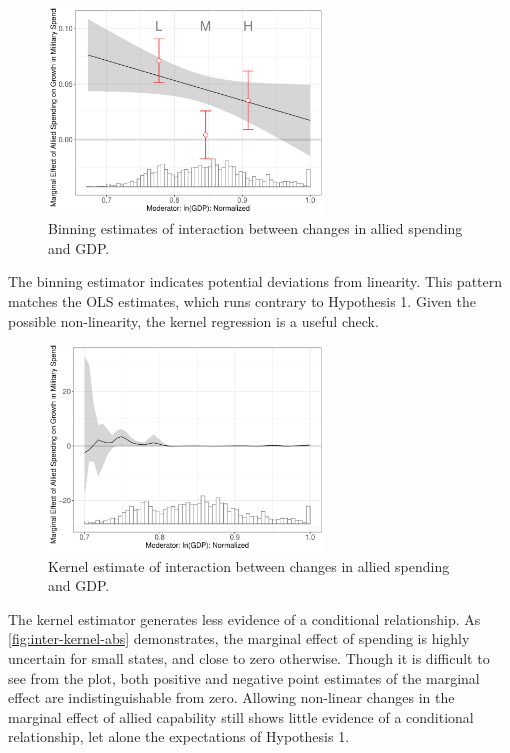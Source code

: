 \documentclass[12pt]{article}
\begin{document}
\begin{figure}
	\centering
		\includegraphics[width=0.65\textwidth]{inter-bin-abs.pdf}
		\caption{Binning estimates of interaction between changes in allied spending and GDP.}
	\label{fig:inter-bin-abs}
\end{figure}


The binning estimator indicates potential deviations from linearity. 
This pattern matches the OLS estimates, which runs contrary to Hypothesis 1. 
Given the possible non-linearity, the kernel regression is a useful check. 


\begin{figure}
	\centering
		\includegraphics[width=0.65\textwidth]{inter-kernel-abs.pdf}
	\caption{Kernel estimate of interaction between changes in allied spending and GDP.}
	\label{fig:inter-kernel-abs}
\end{figure}


The kernel estimator generates less evidence of a conditional relationship. 
As \autoref{fig:inter-kernel-abs} demonstrates, the marginal effect of spending is highly uncertain for small states, and close to zero otherwise. 
Though it is difficult to see from the plot, both positive and negative point estimates of the marginal effect are indistinguishable from zero. 
Allowing non-linear changes in the marginal effect of allied capability still shows little evidence of a conditional relationship, let alone the expectations of Hypothesis 1. 
\end{document}
